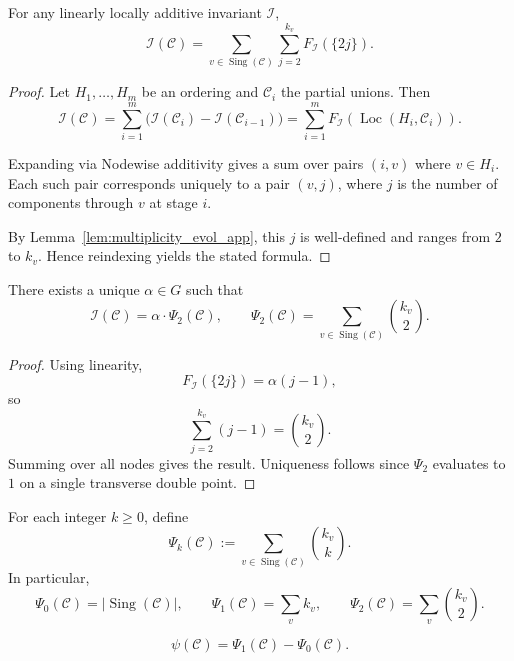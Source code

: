 \documentclass[article,11pt]{amsart} \numberwithin{equation}{section}
\numberwithin{equation}{section}
\begin{document}
{\begin{thm}
	\label{thm:telescoping_app}
	For any linearly locally additive invariant \(\mathcal I\),
	\[
	\mathcal I(\mathcal C)=\sum_{v\in\operatorname{Sing}(\mathcal C)}\sum_{j=2}^{k_v} F_{\mathcal I}(\{2j\}).
	\]
\end{thm}

\begin{proof}
	Let \(H_1,\dots,H_m\) be an ordering and \(\mathcal C_i\) the partial unions. Then
	\[
	\mathcal I(\mathcal C)=\sum_{i=1}^m \bigl(\mathcal I(\mathcal C_i)-\mathcal I(\mathcal C_{i-1})\bigr)
	=\sum_{i=1}^m F_{\mathcal I}(\operatorname{Loc}(H_i,\mathcal C_i)).
	\]
	
	Expanding via Nodewise additivity gives a sum over pairs \((i,v)\) where \(v\in H_i\). Each such pair corresponds uniquely to a pair \((v,j)\), where \(j\) is the number of components through \(v\) at stage \(i\).
	
	By Lemma~\ref{lem:multiplicity_evol_app}, this \(j\) is well-defined and ranges from \(2\) to \(k_v\). Hence reindexing yields the stated formula.
\end{proof}

\begin{inp}
	\label{prop:universal_form_app}
	There exists a unique \(\alpha\in G\) such that
	\[
	\mathcal I(\mathcal C)=\alpha\cdot \Psi_2(\mathcal C),
	\qquad
	\Psi_2(\mathcal C)=\sum_{v\in\operatorname{Sing}(\mathcal C)}\binom{k_v}{2}.
	\]
\end{inp}

\begin{proof}
	Using linearity,
	\[
	F_{\mathcal I}(\{2j\})=\alpha (j-1),
	\]
	so
	\[
	\sum_{j=2}^{k_v} (j-1)=\binom{k_v}{2}.
	\]
	Summing over all nodes gives the result. Uniqueness follows since \(\Psi_2\) evaluates to \(1\) on a single transverse double point.
\end{proof}

\begin{df}
	\label{def:psi_k_app}
	For each integer \(k\ge 0\), define
	\[
	\Psi_k(\mathcal C):=\sum_{v\in\operatorname{Sing}(\mathcal C)}\binom{k_v}{k}.
	\]
	In particular,
	\[
	\Psi_0(\mathcal C)=|\operatorname{Sing}(\mathcal C)|,\qquad
	\Psi_1(\mathcal C)=\sum_{v} k_v,\qquad
	\Psi_2(\mathcal C)=\sum_{v}\binom{k_v}{2}.
	\]
\end{df}

\begin{inp}
	\label{prop:psi_finite_diff_app}
	\[
	\psi(\mathcal C)=\Psi_1(\mathcal C)-\Psi_0(\mathcal C).
	\]
\end{inp}

}
\end{document}
